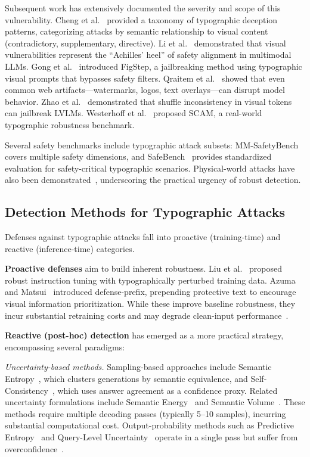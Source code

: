 \documentclass[preprint,12pt]{elsarticle}
\begin{document}
Subsequent work has extensively documented the severity and scope of this vulnerability. Cheng et al.~\cite{cheng2024unveiling} provided a taxonomy of typographic deception patterns, categorizing attacks by semantic relationship to visual content (contradictory, supplementary, directive). Li et al.~\cite{li2024images} demonstrated that visual vulnerabilities represent the ``Achilles' heel'' of safety alignment in multimodal LLMs. Gong et al.~\cite{gong2025figstep} introduced FigStep, a jailbreaking method using typographic visual prompts that bypasses safety filters. Qraitem et al.~\cite{qraitem2025web} showed that even common web artifacts---watermarks, logos, text overlays---can disrupt model behavior. Zhao et al.~\cite{zhao2025jailbreaking} demonstrated that shuffle inconsistency in visual tokens can jailbreak LVLMs. Westerhoff et al.~\cite{westerhoff2025scam} proposed SCAM, a real-world typographic robustness benchmark.

Several safety benchmarks include typographic attack subsets: MM-SafetyBench~\cite{liu2024mm} covers multiple safety dimensions, and SafeBench~\cite{gong2025figstep} provides standardized evaluation for safety-critical typographic scenarios. Physical-world attacks have also been demonstrated~\cite{ling2026physical}, underscoring the practical urgency of robust detection.

\subsection{Detection Methods for Typographic Attacks}

Defenses against typographic attacks fall into proactive (training-time) and reactive (inference-time) categories.

\textbf{Proactive defenses} aim to build inherent robustness. Liu et al.~\cite{liu2023mitigating} proposed robust instruction tuning with typographically perturbed training data. Azuma and Matsui~\cite{azuma2023defense} introduced defense-prefix, prepending protective text to encourage visual information prioritization. While these improve baseline robustness, they incur substantial retraining costs and may degrade clean-input performance~\cite{bengio2025international}.

\textbf{Reactive (post-hoc) detection} has emerged as a more practical strategy, encompassing several paradigms:

\textit{Uncertainty-based methods.} Sampling-based approaches include Semantic Entropy~\cite{farquhar2024detecting}, which clusters generations by semantic equivalence, and Self-Consistency~\cite{wang2022self}, which uses answer agreement as a confidence proxy. Related uncertainty formulations include Semantic Energy~\cite{ma2025semantic} and Semantic Volume~\cite{li2026semantic}. These methods require multiple decoding passes (typically 5--10 samples), incurring substantial computational cost. Output-probability methods such as Predictive Entropy~\cite{kadavath2022language,malinin2020uncertainty} and Query-Level Uncertainty~\cite{chen2025query} operate in a single pass but suffer from overconfidence~\cite{guo2017calibration,tian2023just}.
\end{document}
